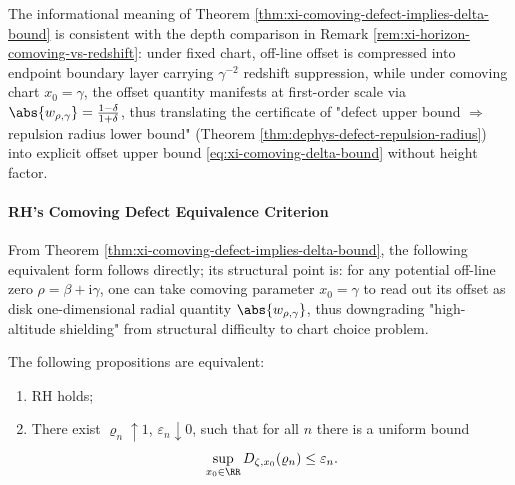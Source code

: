 \begin{remark}\label{rem:xi-comoving-defect-visibility-upgrade}
The informational meaning of Theorem \ref{thm:xi-comoving-defect-implies-delta-bound} is consistent with the depth comparison in Remark \ref{rem:xi-horizon-comoving-vs-redshift}: under fixed chart, off-line offset is compressed into endpoint boundary layer carrying \(\gamma^{-2}\) redshift suppression, while under comoving chart \(x_0=\gamma\), the offset quantity manifests at first-order scale via \(\abs{w_{\rho,\gamma}}=\frac{1-\delta}{1+\delta}\), thus translating the certificate of "defect upper bound \(\Rightarrow\) repulsion radius lower bound" (Theorem \ref{thm:dephys-defect-repulsion-radius}) into explicit offset upper bound \eqref{eq:xi-comoving-delta-bound} without height factor.
\end{remark}

\paragraph{RH's Comoving Defect Equivalence Criterion}
From Theorem \ref{thm:xi-comoving-defect-implies-delta-bound}, the following equivalent form follows directly; its structural point is: for any potential off-line zero \(\rho=\beta+\mathrm{i}\gamma\), one can take comoving parameter \(x_0=\gamma\) to read out its offset as disk one-dimensional radial quantity \(\abs{w_{\rho,\gamma}}\), thus downgrading "high-altitude shielding" from structural difficulty to chart choice problem.

\begin{theorem}\label{thm:xi-rh-iff-uniform-comoving-defect}
The following propositions are equivalent:
\begin{enumerate}
  \item[(i)] RH holds;
  \item[(ii)] There exist \(\varrho_n\uparrow 1\), \(\varepsilon_n\downarrow 0\), such that for all \(n\) there is a uniform bound
  \[
  \sup_{x_0\in\RR}D_{\zeta,x_0}(\varrho_n)\le \varepsilon_n.
  \]
\end{enumerate}
\end{theorem}

